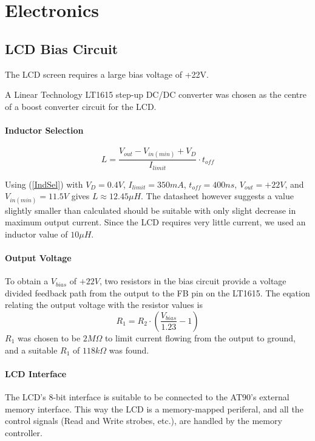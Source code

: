 \documentclass[a4paper,10pt]{scrreprt}
\begin{document}
\section{Electronics}

\subsection{LCD Bias Circuit}

The LCD screen requires a large bias voltage of +22V.

A Linear Technology LT1615 step-up DC/DC converter was chosen as the centre of a boost converter circuit for the LCD.

\paragraph{Inductor Selection}

\begin{equation}\label{IndSel}
 L=\frac{V_{out}-V_{in(min)}+V_D}{I_{limit}}\cdot t_{off}
\end{equation}

Using (\ref{IndSel}) with $V_D=0.4V$, $I_{limit}=350mA$, $t_{off}=400ns$, $V_{out}=+22V$, and $V_{in(min)}=11.5V$ gives $L\approx12.45 \mu{H}$. The datasheet however suggests a value slightly smaller than calculated should be suitable with only slight decrease in maximum output current. Since the LCD requires very little current, we used an inductor value of $10\mu{H}$.


\paragraph{Output Voltage}

To obtain a $V_{bias}$ of $+22V$, two resistors in the bias circuit provide a voltage divided feedback path from the output to the FB pin on the LT1615. The eqation relating the output voltage with the resistor values is
\begin{equation}
  R_1=R_2\cdot \left(\frac{V_{bias}}{1.23}-1\right)
\end{equation}
$R_1$ was chosen to be $2M\Omega$ to limit current flowing from the output to ground, and a suitable $R_1$ of $118k\Omega$ was found.

\paragraph{LCD Interface}
The LCD's 8-bit interface is suitable to be connected to the AT90's external memory interface. This way the LCD is a memory-mapped periferal, and all the control signals (Read and Write strobes, etc.), are handled by the memory controller.
\end{document}

